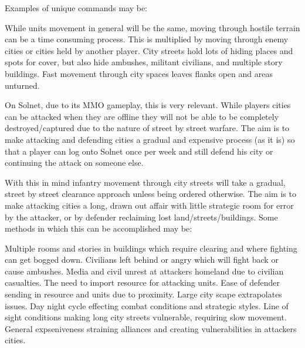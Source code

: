 Examples of unique commands may be:
\startitemize[16]
 \item[suppressive fire]
 \item[draw fire]
 \item[ignore enemy fire]
 \item[grenade or various explosives]
 \item[charge]
 \item[hide]
 \item[take cover]
 \item[destroy cover]
 \item[assist]
 \item[mantle]
 \item[dismantle]
 \item[force reload]
 \item[regroup]
 \item[repair]
 \item[medical attention]
 \item[call fire support]
\stopitemize



While units movement in general will be the same, moving through hostile terrain can be a time consuming process. This is multiplied by moving through enemy cities or cities held by another player. City streets hold lots of hiding places and spots for cover, but also hide ambushes, militant civilians, and multiple story buildings. Fast movement through city spaces leaves flanks open and areas unturned. 

On Solnet, due to its MMO gameplay, this is very relevant. While players cities can be attacked when they are offline they will not be able to be completely destroyed/captured due to the nature of street by street warfare. The aim is to make attacking and defending cities a gradual and expensive process (as it is) so that a player can log onto Solnet once per week and still defend his city or continuing the attack on someone else. 

With this in mind infantry movement through city streets will take a gradual, street by street clearance approach unless being ordered otherwise. The aim is to make attacking cities a long, drawn out affair with little strategic room for error by the attacker, or by defender reclaiming lost land/streets/buildings. Some methods in which this can be accomplished may be:
 
Multiple rooms and stories in buildings which require clearing and where fighting can get bogged down.
 Civilians left behind or angry which will fight back or cause ambushes.
 Media and civil unrest at attackers homeland due to civilian casualties.
 The need to import resource for attacking units.
 Ease of defender sending in resource and units due to proximity.
 Large city scape extrapolates issues. 
 Day night cycle effecting combat conditions and strategic styles.
 Line of sight conditions making long city streets vulnerable, requiring slow movement.
 General expseniveness straining alliances and creating vulnerabilities in attackers cities. 




